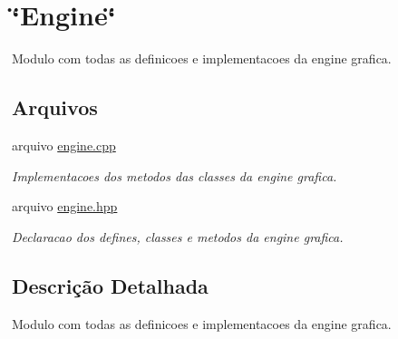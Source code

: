 \hypertarget{group__MOD__ENGINE}{
\section{\char`\"{}Engine\char`\"{}}
\label{group__MOD__ENGINE}
}


Modulo com todas as definicoes e implementacoes da engine grafica.  


\subsection*{Arquivos}
\begin{DoxyCompactItemize}
\item 
arquivo \hyperlink{engine_8cpp}{engine.cpp}


\begin{DoxyCompactList}\small\item\em Implementacoes dos metodos das classes da engine grafica. \item\end{DoxyCompactList}

\item 
arquivo \hyperlink{engine_8hpp}{engine.hpp}


\begin{DoxyCompactList}\small\item\em Declaracao dos defines, classes e metodos da engine grafica. \item\end{DoxyCompactList}

\end{DoxyCompactItemize}


\subsection{Descrição Detalhada}
Modulo com todas as definicoes e implementacoes da engine grafica. 
